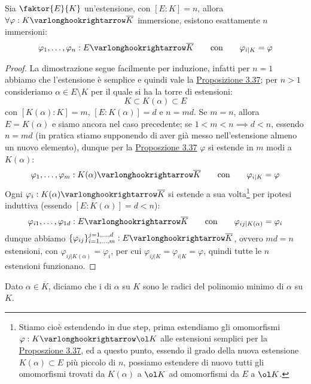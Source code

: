 \documentclass[11pt]{scrartcl}
\begin{document}
\pagebreak

\begin{corollary}
    \label{3.39}
    Sia $\faktor{E}{K}$ un'estensione, con $[E:K] = n$, allora $\forall \varphi : K \varlonghookrightarrow \overline K$ immersione, esistono esattamente $n$ immersioni:
    \[ \varphi_1,\ldots,\varphi_n : E \varlonghookrightarrow \overline K \qquad \text{con} \qquad \varphi_{i|K} = \varphi
        \]
\end{corollary}

\begin{proof}
    La dimostrazione segue facilmente per induzione, infatti per $n = 1$ abbiamo che l'estensione è semplice e quindi vale la \hyperref[3.37]{Proposizione 3.37}; per $n>1$ consideriamo
    $\alpha \in E \setminus K$ per il quale si ha la torre di estensioni:
    \[ K \subset K(\alpha) \subset E
        \]
    con $[K(\alpha) : K] = m$, $[E : K(\alpha)] = d$ e $n = md$. Se $m = n$, allora $E = K(\alpha)$ e siamo ancora nel caso precedente; se $1 < m < n \implies d < n$,
    essendo $n = md$ (in pratica stiamo supponendo di aver già messo nell'estensione almeno un nuovo elemento), dunque per la \hyperref[3.37]{Proposzione 3.37} $\varphi$ si estende in $m$ modi a $K(\alpha)$:
    \[ \varphi_1,\ldots,\varphi_m : K(\alpha) \varlonghookrightarrow \overline K \qquad \text{con} \qquad \varphi_{i|K} = \varphi
        \]
    Ogni $\varphi_i : K(\alpha) \varlonghookrightarrow \overline K$ si estende a sua volta\footnote{Stiamo cioè estendendo in due step, prima estendiamo gli omomorfismi $\varphi : K \varlonghookrightarrow \ol K$ alle estensioni semplici per la \hyperref[3.37]{Proposzione 3.37}, ed a questo punto, essendo il grado della nuova 
    estensione $K(\alpha) \subset E$ più piccolo di $n$, possiamo estendere di nuovo tutti gli omomorfismi trovati da $K(\alpha)$ a $\ol K$ ad omomorfismi da $E$ a $\ol K$.} per ipotesi induttiva (essendo $[E : K(\alpha)] = d < n$):
    \[ \varphi_{i1},\ldots,\varphi_{1d} : E \varlonghookrightarrow \overline K \qquad \text{con} \qquad \varphi_{ij|K(\alpha)} = \varphi_i
        \]
    dunque abbiamo $\{\varphi_{ij}\}_{i = 1,\ldots,m}^{j = 1,\ldots,d} : E \varlonghookrightarrow \overline K$, ovvero $md = n$ estensioni, con $\varphi_{ij | K(\alpha)} = \varphi_i $, per cui $\varphi_{ij|K} = \varphi_{i | K} = \varphi$, quindi tutte le $n$ estensioni funzionano.
\end{proof}

\begin{definition}
    Dato $\alpha \in \overline K$, diciamo che i  di $\alpha$ su $K$ sono le radici del polinomio minimo di $\alpha$ su $K$. 
\end{definition}
\end{document}
